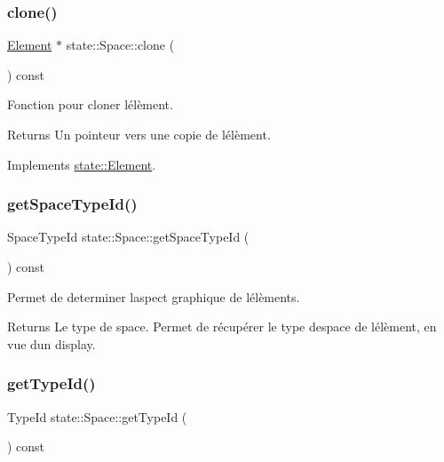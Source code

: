 \subsubsection{\texorpdfstring{clone()}{clone()}}
{\footnotesize\ttfamily \hyperlink{classstate_1_1_element}{Element} $\ast$ state\+::\+Space\+::clone (\begin{DoxyParamCaption}{ }\end{DoxyParamCaption}) const\hspace{0.3cm}{\ttfamily [virtual]}}



Fonction pour cloner l\textquotesingle{}élèment. 

\begin{DoxyReturn}{Returns}
Un pointeur vers une copie de l\textquotesingle{}élèment. 
\end{DoxyReturn}


Implements \hyperlink{classstate_1_1_element}{state\+::\+Element}.

\mbox{\label{classstate_1_1_space_af05208d104c93dbffdb2643e2e2f54cf}} 
\subsubsection{\texorpdfstring{get\+Space\+Type\+Id()}{getSpaceTypeId()}}
{\footnotesize\ttfamily Space\+Type\+Id state\+::\+Space\+::get\+Space\+Type\+Id (\begin{DoxyParamCaption}{ }\end{DoxyParamCaption}) const}



Permet de determiner l\textquotesingle{}aspect graphique de l\textquotesingle{}élèments. 

\begin{DoxyReturn}{Returns}
Le type de space. Permet de récupérer le type d\textquotesingle{}espace de l\textquotesingle{}élèment, en vue d\textquotesingle{}un display. 
\end{DoxyReturn}
\mbox{\label{classstate_1_1_space_a07fcfd9de95acfebb26e66f24f4ef519}} 
\subsubsection{\texorpdfstring{get\+Type\+Id()}{getTypeId()}}
{\footnotesize\ttfamily Type\+Id state\+::\+Space\+::get\+Type\+Id (\begin{DoxyParamCaption}{ }\end{DoxyParamCaption}) const\hspace{0.3cm}{\ttfamily [virtual]}}



